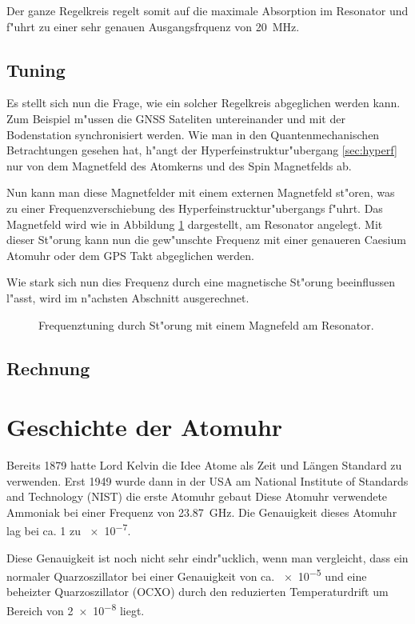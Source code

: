 \begin{refsection}
Der ganze Regelkreis regelt somit auf die maximale Absorption im
Resonator und f"uhrt zu einer sehr genauen Ausgangsfrquenz von
\SI{20}{\mega\hertz}.

\subsection{Tuning}
Es stellt sich nun die Frage, wie ein solcher Regelkreis abgeglichen
werden kann.  Zum Beispiel m"ussen die GNSS Sateliten untereinander
und mit der Bodenstation synchronisiert werden.  Wie man in den
Quantenmechanischen Betrachtungen gesehen hat, h"angt der
Hyperfeinstruktur"ubergang \ref{sec:hyperf} nur von dem Magnetfeld des
Atomkerns und des Spin Magnetfelds ab.

Nun kann man diese Magnetfelder mit einem externen Magnetfeld st"oren,
was zu einer Frequenzverschiebung des Hyperfeinstrucktur"ubergangs
f"uhrt.  Das Magnetfeld wird wie in Abbildung \ref{fig:tuning}
dargestellt, am Resonator angelegt.  Mit dieser St"orung kann nun die
gew"unschte Frequenz mit einer genaueren Caesium Atomuhr oder dem GPS
Takt abgeglichen werden.

Wie stark sich nun dies Frequenz durch eine magnetische St"orung
beeinflussen l"asst, wird im n"achsten Abschnitt ausgerechnet.

\begin{figure}
  \centering
  
  \caption{Frequenztuning durch St"orung mit einem Magnefeld am Resonator.}
  \label{fig:tuning}
\end{figure}

\subsection{Rechnung}

\section{Geschichte der Atomuhr}
\label{sec:gesch-der-atom}
Bereits 1879 hatte Lord Kelvin die Idee Atome als Zeit und Längen
Standard zu verwenden.  Erst 1949 wurde dann in der USA am National
Institute of Standards and Technology (NIST) die erste Atomuhr gebaut
\cite{ieee:nist} Diese Atomuhr verwendete Ammoniak bei einer Frequenz
von \SI{23.87}{\giga\hertz}.  Die Genauigkeit dieses Atomuhr lag bei
ca. 1 zu \num{e-7}.

Diese Genauigkeit ist noch nicht sehr eindr"ucklich, wenn man
vergleicht, dass ein normaler Quarzoszillator bei einer Genauigkeit
von ca. \num{e-5} und eine beheizter Quarzoszillator (OCXO) durch den
reduzierten Temperaturdrift um Bereich von \num{2e-8} liegt.


\end{refsection}
